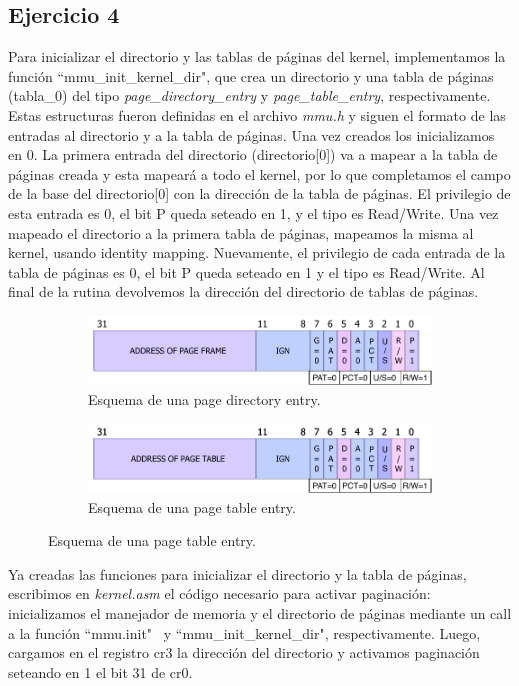 \documentclass[a4paper]{article}
\begin{document}
\subsection{Ejercicio 4}
\justify
Para inicializar el directorio y las tablas de páginas del kernel, implementamos la función ``mmu_init_kernel_dir", que crea un directorio y una tabla de páginas (tabla_0) del tipo \textit{page_directory_entry}  y \textit{page_table_entry}, respectivamente. Estas estructuras fueron definidas en el archivo \textit{mmu.h} y siguen el formato de las entradas al directorio y a la tabla de páginas. Una vez creados los inicializamos en 0.
\justify
La primera entrada del directorio (directorio[0]) va a mapear a la tabla de páginas creada y esta mapeará a todo el kernel, por lo que completamos el campo de la base del directorio[0] con la dirección de la tabla de páginas. El privilegio de esta entrada es 0, el bit P queda seteado en 1, y el tipo es Read/Write. Una vez mapeado el directorio a la primera tabla de páginas, mapeamos la misma al kernel, usando identity mapping. Nuevamente, el privilegio de cada entrada de la tabla de páginas es 0, el bit P queda seteado en 1 y el tipo es Read/Write. Al final de la rutina devolvemos la dirección del directorio de tablas de páginas. 
 
 \begin{figure}[h!]
 	\centering
 	\begin{subfigure}[b]{0.49 \textwidth}
 		\includegraphics[width=\textwidth]{img/pde.pdf}
 		\caption{Esquema de una page directory entry.}
 	\end{subfigure}
 	\hfill
 	\begin{subfigure}[b]{0.49 \textwidth}
 		\includegraphics[width=\textwidth]{img/pte.pdf}
 		\caption{Esquema de una page table entry.}
 	\end{subfigure}
 \end{figure}

\newpage 
\justify  
Ya creadas las funciones para inicializar el directorio y la tabla de páginas, escribimos en \textit{kernel.asm} el código necesario para activar paginación: inicializamos el manejador de memoria y el directorio de páginas mediante un call a la función ``mmu.init" \ y ``mmu_init_kernel_dir", respectivamente. Luego, cargamos en el registro cr3 la dirección del directorio y activamos paginación seteando en 1 el bit 31 de cr0.
\end{document}
